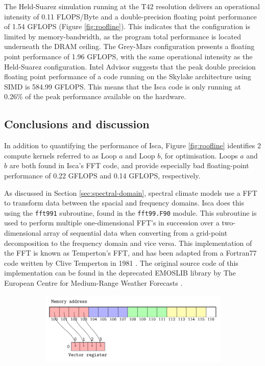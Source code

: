 \documentclass[a4paper,11pt]{report}
\begin{document}
The Held-Suarez simulation running at the T42 resolution delivers an operational intensity of 0.11 FLOPS/Byte and a double-precision floating point performance of 1.54 GFLOPS (Figure \ref{fig:roofline}). This indicates that the configuration is limited by memory-bandwidth, as the program total performance is located underneath the DRAM ceiling. The Grey-Mars configuration presents a floating point performance of 1.96 GFLOPS, with the same operational intensity as the Held-Suarez configuration. Intel Advisor suggests that the peak double precision floating point performance of a code running on the Skylake architecture using SIMD is 584.99 GFLOPS. This means that the Isca code is only running at 0.26\% of the peak performance available on the hardware.

\subsection{Conclusions and discussion}
In addition to quantifying the performance of Isca, Figure \ref{fig:roofline} identifies 2 compute kernels referred to as Loop $a$ and Loop $b$, for optimisation. Loops $a$ and $b$ are both found in Isca's FFT code, and provide especially bad floating-point performance of 0.22 GFLOPS and 0.14 GFLOPS, respectively. 
\par
As discussed in Section \ref{sec:spectral-domain}, spectral climate models use a FFT to transform data between the spacial and frequency domains. Isca does this using the \texttt{fft991} subroutine, found in the \texttt{fft99.F90} module. This subroutine is used to perform multiple one-dimensional FFT's in succession over a two-dimensional array of sequential data when converting from a grid-point decomposition to the frequency domain and vice versa. This implementation of the FFT is known as Temperton's FFT, and has been adapted from a Fortran77 code written by Clive Temperton in 1981 \cite{temperton1980fft}. The original source code of this implementation can be found in the deprecated EMOSLIB library by The European Centre for Medium-Range Weather Forecasts \cite{ecmwf2015emoslib}.
\par
\begin{figure}[htbp]
\centering
\begin{subfigure}[b]{1\textwidth}
\centering
   \includegraphics[width=0.9\linewidth]{img/tikz-img/vector_registers_contiguous/vector_registers.pdf}
   \caption{}
   \label{fig:Ng1} 
\end{subfigure}
\end{figure}
\end{document}
